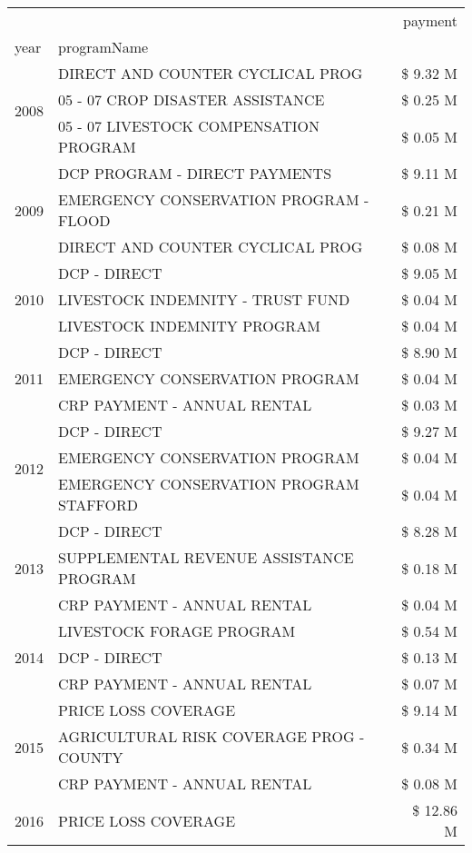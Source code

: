 \begin{tabular}{llr}
\toprule
 &  & payment \\
year & programName &  \\
\midrule
\multirow[t]{3}{*}{2008} & DIRECT AND COUNTER CYCLICAL PROG & \$ 9.32 M \\
 & 05 - 07 CROP DISASTER ASSISTANCE & \$ 0.25 M \\
 & 05 - 07 LIVESTOCK COMPENSATION PROGRAM & \$ 0.05 M \\
\cline{1-3}
\multirow[t]{3}{*}{2009} & DCP PROGRAM - DIRECT PAYMENTS & \$ 9.11 M \\
 & EMERGENCY CONSERVATION PROGRAM - FLOOD & \$ 0.21 M \\
 & DIRECT AND COUNTER CYCLICAL PROG & \$ 0.08 M \\
\cline{1-3}
\multirow[t]{3}{*}{2010} & DCP - DIRECT & \$ 9.05 M \\
 & LIVESTOCK INDEMNITY - TRUST FUND & \$ 0.04 M \\
 & LIVESTOCK INDEMNITY PROGRAM & \$ 0.04 M \\
\cline{1-3}
\multirow[t]{3}{*}{2011} & DCP - DIRECT & \$ 8.90 M \\
 & EMERGENCY CONSERVATION PROGRAM & \$ 0.04 M \\
 & CRP PAYMENT - ANNUAL RENTAL & \$ 0.03 M \\
\cline{1-3}
\multirow[t]{3}{*}{2012} & DCP - DIRECT & \$ 9.27 M \\
 & EMERGENCY CONSERVATION PROGRAM & \$ 0.04 M \\
 & EMERGENCY CONSERVATION PROGRAM STAFFORD & \$ 0.04 M \\
\cline{1-3}
\multirow[t]{3}{*}{2013} & DCP - DIRECT & \$ 8.28 M \\
 & SUPPLEMENTAL REVENUE ASSISTANCE PROGRAM & \$ 0.18 M \\
 & CRP PAYMENT - ANNUAL RENTAL & \$ 0.04 M \\
\cline{1-3}
\multirow[t]{3}{*}{2014} & LIVESTOCK FORAGE PROGRAM & \$ 0.54 M \\
 & DCP - DIRECT & \$ 0.13 M \\
 & CRP PAYMENT - ANNUAL RENTAL & \$ 0.07 M \\
\cline{1-3}
\multirow[t]{3}{*}{2015} & PRICE LOSS COVERAGE & \$ 9.14 M \\
 & AGRICULTURAL RISK COVERAGE PROG - COUNTY & \$ 0.34 M \\
 & CRP PAYMENT - ANNUAL RENTAL & \$ 0.08 M \\
\cline{1-3}
\multirow[t]{3}{*}{2016} & PRICE LOSS COVERAGE & \$ 12.86 M \\

\end{tabular}
